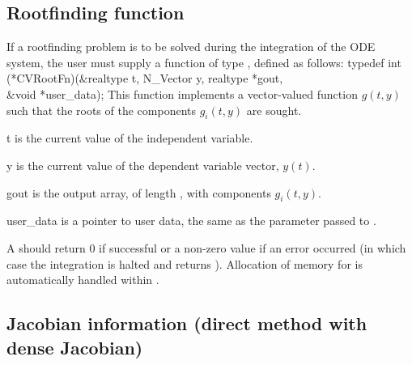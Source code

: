 \subsection{Rootfinding function}\label{ss:rootFn}
If a rootfinding problem is to be solved during the integration of the ODE system,
the user must supply a {\CC} function of type , defined as follows:
{
  typedef int (*CVRootFn)(&realtype t, N\_Vector y, realtype *gout, \\
                          &void *user\_data);
}
{
  This function implements a vector-valued function $g(t,y)$ such that the roots of 
  the  components $g_i(t,y)$ are sought.
}
{
  \begin{args}
  \item[t]
    is the current value of the independent variable.
  \item[y]
    is the current value of the dependent variable vector, $y(t)$.
  \item[gout]
    is the output array, of length , with components $g_i(t,y)$.
  \item[user\_data]
    is a pointer to user data, the same as the       
    parameter passed to .   
  \end{args}
}
{
  A  should return 0 if successful or a non-zero value if
  an error occurred (in which case the integration is halted and  returns
  ).
}
{
  Allocation of memory for  is automatically handled within {\cvodes}.
}


\subsection{Jacobian information (direct method with dense Jacobian)}
\label{ss:djacFn}

